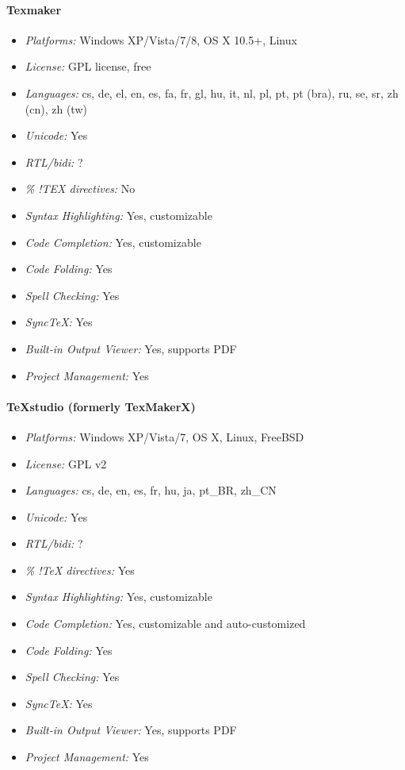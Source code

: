 \paragraph{Texmaker}

\begin{itemize}
    \item \textit{Platforms:} Windows XP/Vista/7/8, OS X 10.5+, Linux
    \item \textit{License:} GPL license, free
    \item \textit{Languages:} cs, de, el, en, es, fa, fr, gl, hu, it, nl, pl, pt, pt (bra), ru, se, sr, zh (cn), zh (tw)
    \item \textit{Unicode:} Yes
    \item \textit{RTL/bidi:} ?
    \item \textit{\% !TEX directives:} No
    \item \textit{Syntax Highlighting:} Yes, customizable
    \item \textit{Code Completion:} Yes, customizable
    \item \textit{Code Folding:} Yes
    \item \textit{Spell Checking:} Yes
    \item \textit{SyncTeX:} Yes
    \item \textit{Built-in Output Viewer:} Yes, supports PDF
    \item \textit{Project Management:} Yes
\end{itemize}

\paragraph{TeXstudio (formerly TexMakerX)}

\begin{itemize}
    \item \textit{Platforms:} Windows XP/Vista/7, OS X, Linux, FreeBSD
    \item \textit{License:} GPL v2
    \item \textit{Languages:} cs, de, en, es, fr, hu, ja, pt\_BR, zh\_CN
    \item \textit{Unicode:} Yes
    \item \textit{RTL/bidi:} ?
    \item \textit{\% !TeX directives:} Yes
    \item \textit{Syntax Highlighting:} Yes, customizable
    \item \textit{Code Completion:} Yes, customizable and auto-customized
    \item \textit{Code Folding:} Yes
    \item \textit{Spell Checking:} Yes
    \item \textit{SyncTeX:} Yes
    \item \textit{Built-in Output Viewer:} Yes, supports PDF
    \item \textit{Project Management:} Yes
\end{itemize}

